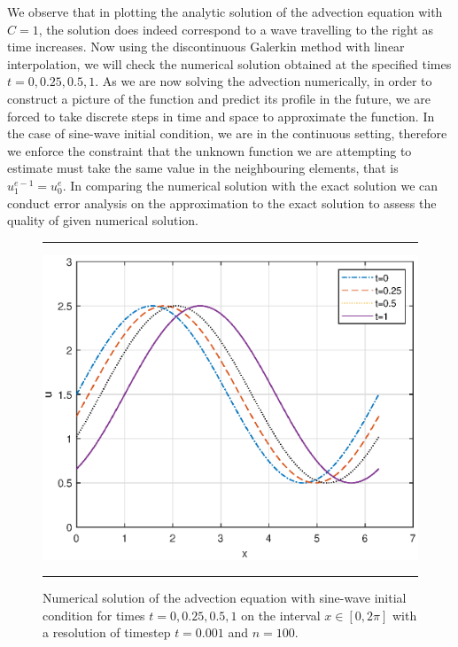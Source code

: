 \documentclass[a4paper, 12pt]{article}
\begin{document}
We observe that in plotting the analytic solution of the advection equation with $C=1$, the solution does indeed correspond to a wave travelling to the right as time increases. Now using the discontinuous Galerkin method with linear interpolation, we will check the numerical solution obtained at the specified times $t=0,0.25,0.5,1$. As we are now solving the advection numerically, in order to construct a picture of the function and predict its profile in the future, we are forced to take discrete steps in time and space to approximate the function. In the case of sine-wave initial condition, we are in the continuous setting, therefore we enforce the constraint that the unknown function we are attempting to estimate must take the same value in the neighbouring elements, that is $u^{e-1}_1 = u^{e}_0$. In comparing the numerical solution with the exact solution we can conduct error analysis on the approximation to the exact solution to assess the quality of given numerical solution.\\ 

     
  
\begin{figure}[H]
\centering
\rule{\linewidth}{.4pt}
\includegraphics[scale=0.75]{Q1_approximatesolution}
\caption{Numerical solution of the advection equation with sine-wave initial condition for times $t=0,0.25,0.5,1$ on the interval $x\in[0,2\pi]$ with a resolution of timestep $t=0.001$ and $n=100$.}
\rule{\linewidth}{.4pt}  
\end{figure}
\end{document}

